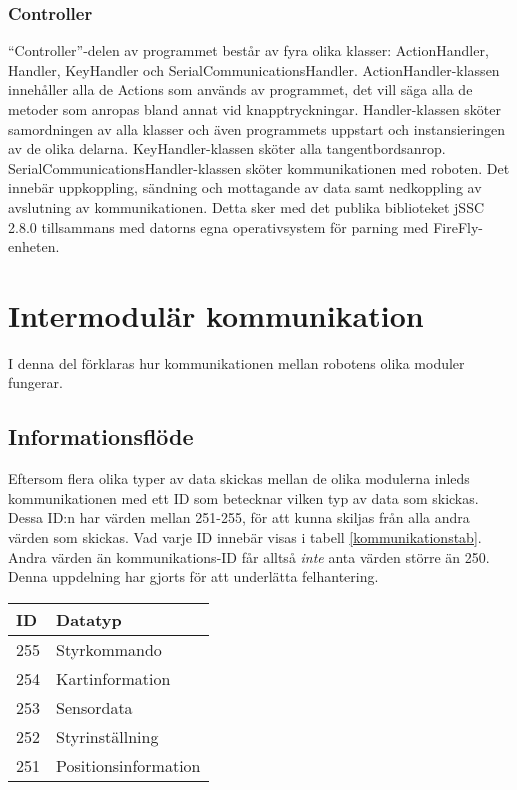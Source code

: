 \documentclass[11pt]{article}
\begin{document}
\begin{flushleft}
\subsubsection{Controller}
``Controller''-delen av programmet består av fyra olika klasser: ActionHandler, Handler, KeyHandler och SerialCommunicationsHandler. 
ActionHandler-klassen innehåller alla de Actions som används av programmet, det vill säga alla de metoder som anropas bland annat vid knapptryckningar.
Handler-klassen sköter samordningen av alla klasser och även programmets uppstart och instansieringen av de olika delarna.
KeyHandler-klassen sköter alla tangentbordsanrop.
SerialCommunicationsHandler-klassen sköter kommunikationen med roboten. Det innebär uppkoppling, sändning och mottagande av data samt nedkoppling av avslutning av kommunikationen. Detta sker med det publika biblioteket jSSC 2.8.0 tillsammans med datorns egna operativsystem för parning med FireFly-enheten.

\pagebreak

\section{Intermodulär kommunikation}
I denna del förklaras hur kommunikationen mellan robotens olika moduler fungerar.

\subsection{Informationsflöde}
Eftersom flera olika typer av data skickas mellan de olika modulerna inleds kommunikationen med ett ID som betecknar vilken typ av data som skickas. Dessa ID:n har värden mellan 251-255, för att kunna skiljas från alla andra värden som skickas. Vad varje ID innebär visas i tabell \ref{kommunikationstab}. Andra värden än kommunikations-ID får alltså \emph{inte} anta värden större än 250. Denna uppdelning har gjorts för att underlätta felhantering.

\begin{longtable}[l]{| l | l |} \hline
\textbf{ID} & \textbf{Datatyp} \\ \hline 
255 & Styrkommando \\ \hline
254 & Kartinformation \\ \hline
253 & Sensordata \\ \hline
252 & Styrinställning \\ \hline
251 & Positionsinformation \\ \hline


\end{longtable}
\end{flushleft}
\end{document}
